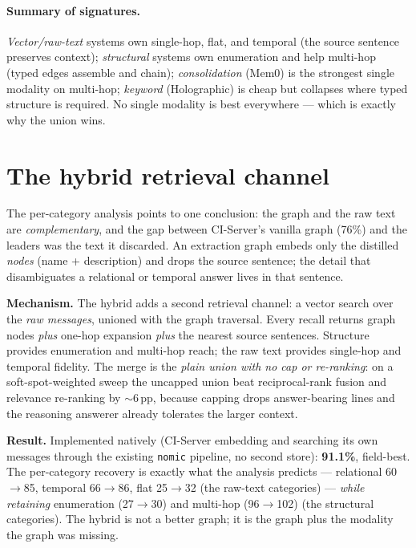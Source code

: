 \documentclass[11pt]{article}
\newcommand{\sapp}{$\sim$}            %
\begin{document}
\paragraph{Summary of signatures.} \emph{Vector/raw-text} systems own single-hop, flat, and temporal (the
source sentence preserves context); \emph{structural} systems own enumeration and help multi-hop (typed edges
assemble and chain); \emph{consolidation} (Mem0) is the strongest single modality on multi-hop; \emph{keyword}
(Holographic) is cheap but collapses where typed structure is required. No single modality is best everywhere
--- which is exactly why the union wins.

\section{The hybrid retrieval channel}\label{sec:hybrid}

The per-category analysis points to one conclusion: the graph and the raw text are \emph{complementary}, and
the gap between CI-Server's vanilla graph (76\%) and the leaders was the text it discarded. An extraction graph
embeds only the distilled \emph{nodes} (name + description) and drops the source sentence; the detail that
disambiguates a relational or temporal answer lives in that sentence.

\textbf{Mechanism.} The hybrid adds a second retrieval channel: a vector search over the \emph{raw messages},
unioned with the graph traversal. Every recall returns graph nodes \emph{plus} one-hop expansion \emph{plus}
the nearest source sentences. Structure provides enumeration and multi-hop reach; the raw text provides
single-hop and temporal fidelity. The merge is the \emph{plain union with no cap or re-ranking}: on a
soft-spot-weighted sweep the uncapped union beat reciprocal-rank fusion and relevance re-ranking by \sapp6\,pp,
because capping drops answer-bearing lines and the reasoning answerer already tolerates the larger context.

\textbf{Result.} Implemented natively (CI-Server embedding and searching its own messages through the existing
\texttt{nomic} pipeline, no second store): \textbf{91.1\%}, field-best. The per-category recovery is exactly
what the analysis predicts --- relational 60$\to$85, temporal 66$\to$86, flat 25$\to$32 (the raw-text
categories) --- \emph{while retaining} enumeration (27$\to$30) and multi-hop (96$\to$102) (the structural
categories). The hybrid is not a better graph; it is the graph plus the modality the graph was missing.
\end{document}
